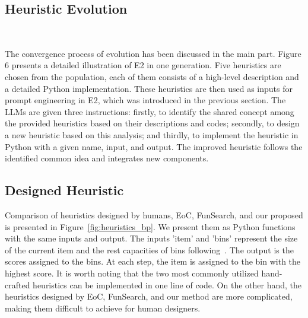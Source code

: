 \subsection{Heuristic Evolution}~\label{e2}


The convergence process of evolution has been discussed in the main part. Figure 6 presents a detailed illustration of  E2 in one generation. Five heuristics are chosen from the population, each of them consists of a high-level description and a detailed Python implementation. These heuristics are then used as inputs for prompt engineering in E2, which was introduced in the previous section. The LLMs are given three instructions: firstly, to identify the shared concept among the provided heuristics based on their descriptions and codes; secondly, to design a new heuristic based on this analysis; and thirdly, to implement the heuristic in Python with a given name, input, and output. The improved heuristic follows the identified common idea and integrates new components.


\subsection{Designed Heuristic}
Comparison of heuristics designed by humans, EoC, FunSearch, and our proposed \ourmethod{} is presented in Figure~\ref{fig:heuristics_bp}. We present them as Python functions with the same inputs and output. The inputs 'item' and 'bins' represent the size of the current item and the rest capacities of bins following~\citet{romera2024mathematical}. The output is the scores assigned to the bins. At each step, the item is assigned to the bin with the highest score. It is worth noting that the two most commonly utilized hand-crafted heuristics can be implemented in one line of code. On the other hand, the heuristics designed by EoC, FunSearch, and our method \ourmethod{} are more complicated, making them difficult to achieve for human designers.


